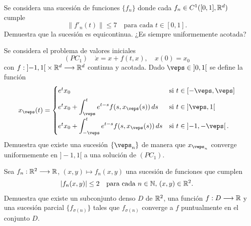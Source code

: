 \documentclass[12pt]{article}
\begin{document}
    \begin{ejercicio}
        Se considera una sucesión de funciones $\{f_n\}$ donde cada $f_n \in C^1([0, 1], \mathbb{R}^d)$ cumple
        \[
        \|f'_n(t)\| \leq 7 \quad \text{para cada } t \in [0, 1].
        \]
        Demuestra que la sucesión es equicontinua. ¿Es siempre uniformemente acotada?
    \end{ejercicio}

    \begin{ejercicio}
        Se considera el problema de valores iniciales
        \[
        (PC_1) \quad \dot{x} = x + f(t, x), \quad x(0) = x_0
        \]
        con $f : \left]-1, 1\right[ \times \mathbb{R}^d \longrightarrow \mathbb{R}^d$ continua y acotada. Dado $\veps \in \left]0, 1\right[$ se define la función
        \[
        x_{\veps}(t) = \begin{cases} 
            e^t x_0 & \text{si } t \in [-\veps, \veps] \\[1ex]
            e^t x_0 + \displaystyle\int_{\veps}^t e^{t-s} f(s, x_{\veps}(s)) \, ds & \text{si } t \in \left]\veps, 1\right[ \\[2ex]
            e^t x_0 + \displaystyle\int_{-\veps}^t e^{t-s} f(s, x_{\veps}(s)) \, ds & \text{si } t \in \left]-1, -\veps\right[.
        \end{cases}
        \]
        Demuestra que existe una sucesión $\{\veps_n\}$ de manera que $x_{\veps_n}$ converge uniformemente en $]-1, 1[$ a una solución de $(PC_1)$.
    \end{ejercicio}

    \begin{ejercicio}
        Sea $f_n : \mathbb{R}^2 \longrightarrow \mathbb{R}$, $(x, y) \mapsto f_n(x, y)$ una sucesión de funciones que cumplen
        \[
        |f_n(x, y)| \leq 2 \quad \text{para cada } n \in \mathbb{N}, \, (x, y) \in \mathbb{R}^2.
        \]
        Demuestra que existe un subconjunto denso $D$ de $\mathbb{R}^2$, una función $f : D \longrightarrow \mathbb{R}$ y una sucesión parcial $\{f_{\sigma(n)}\}$ tales que $f_{\sigma(n)}$ converge a $f$ puntualmente en el conjunto $D$.
    \end{ejercicio}

    \newpage
    \setcounter{ejercicio}{0} %
\end{document}
